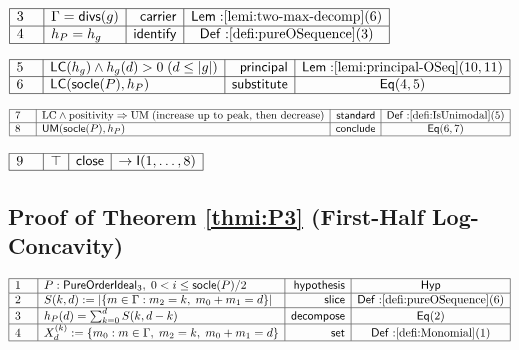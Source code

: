 \documentclass[11pt,reqno]{amsart}
\begin{document}
\nointerlineskip\noindent$%
\begin{array}{|m{0.5cm}|l|r|c|}
\hline
3 & \Gamma=\mathsf{divs}(g) & \mathsf{carrier} & \mathsf{Lem:}\ref%
{lemi:two-max-decomp}(6) \\ \hline
4 & h_{P}=h_{g} & \mathsf{identify} & \mathsf{Def:}\ref{defi:pureOSequence}%
(3) \\ \hline
\end{array}%
$

\nointerlineskip\noindent$%
\begin{array}{|m{0.5cm}|l|r|c|}
\hline
5 & \mathsf{LC}(h_{g})\wedge h_{g}(d)>0\;(d\le|g|) & \mathsf{principal} & 
\mathsf{Lem:}\ref{lemi:principal-OSeq}(10,11) \\ \hline
6 & \mathsf{LC}(\mathsf{socle}(P),h_{P}) & \mathsf{substitute} & \mathsf{Eq}%
(4,5) \\ \hline
\end{array}%
$

\nointerlineskip\noindent$%
\begin{array}{|m{0.5cm}|l|r|c|}
\hline
7 & \text{LC} \wedge \text{positivity}\Rightarrow\text{UM}\;\text{(increase
up to peak, then decrease)} & \mathsf{standard} & \mathsf{Def:}\ref%
{defi:IsUnimodal}(5) \\ \hline
8 & \mathsf{UM}(\mathsf{socle}(P),h_{P}) & \mathsf{conclude} & \mathsf{Eq}%
(6,7) \\ \hline
\end{array}%
$

\nointerlineskip\noindent$%
\begin{array}{|m{0.5cm}|l|r|c|}
\hline
9 & \top & \mathsf{close} & \to\mathsf{I}(1,\dots,8) \\ \hline
\end{array}%
$

\medskip

\subsection*{Proof of Theorem \protect\ref{thmi:P3} (First-Half
Log-Concavity)}

\noindent $%
\begin{array}{|m{0.5cm}|l|r|c|}
\hline
1 & P:\mathsf{PureOrderIdeal}_{3},\;0<i\leq \mathsf{socle}(P)/2 & \mathsf{%
hypothesis} & \mathsf{Hyp} \\ \hline
2 & S(k,d):=|\{m\in \Gamma :m_{2}=k,\;m_{0}+m_{1}=d\}| & \mathsf{slice} & 
\mathsf{Def:}\ref{defi:pureOSequence}(6) \\ \hline
3 & h_{P}(d)=\sum_{k=0}^{d}S(k,d-k) & \mathsf{decompose} & \mathsf{Eq}(2) \\ 
\hline
4 & X_{d}^{(k)}:=\{m_{0}:m\in \Gamma ,\;m_{2}=k,\;m_{0}+m_{1}=d\} & \mathsf{%
set} & \mathsf{Def:}\ref{defi:Monomial}(1) \\ \hline
\end{array}%
$
\end{document}
